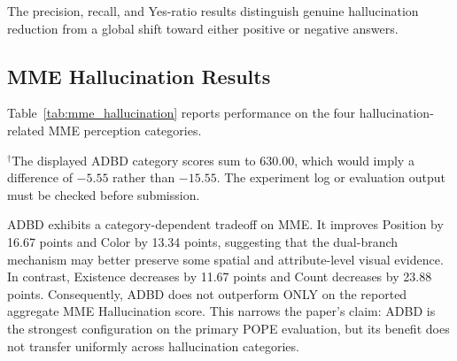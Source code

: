 The precision, recall, and Yes-ratio results distinguish genuine hallucination reduction from a global shift toward either positive or negative answers. 

\subsection{MME Hallucination Results}

Table~\ref{tab:mme_hallucination} reports performance on the four hallucination-related MME perception categories.

\begin{table}[t]
\centering
\small
\setlength{\tabcolsep}{3pt}
\caption{MME Hallucination results. Higher is better. The reported ADBD total is reproduced as supplied.}
\label{tab:mme_hallucination}
\end{table}

\noindent$^{\dagger}$The displayed ADBD category scores sum to 630.00, which would imply a difference of $-5.55$ rather than $-15.55$. The experiment log or evaluation output must be checked before submission.

ADBD exhibits a category-dependent tradeoff on MME. It improves Position by 16.67 points and Color by 13.34 points, suggesting that the dual-branch mechanism may better preserve some spatial and attribute-level visual evidence. In contrast, Existence decreases by 11.67 points and Count decreases by 23.88 points. Consequently, ADBD does not outperform ONLY on the reported aggregate MME Hallucination score. This narrows the paper's claim: ADBD is the strongest configuration on the primary POPE evaluation, but its benefit does not transfer uniformly across hallucination categories.


